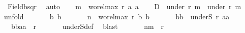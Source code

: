 \begin{isabellebody}
\ Field{\isacharunderscore}{\kern0pt}bsqr\ \isamarkupfalse%
\ auto\isanewline
\ \ \isamarkupfalse%
\ {\isacharquery}{\kern0pt}m\ {\isacharequal}{\kern0pt}\ {\isachardoublequoteopen}wo{\isacharunderscore}{\kern0pt}rel{\isachardot}{\kern0pt}max{}\ r\ a{}\ a{}{\isachardoublequoteclose}\isanewline
\ \ \isamarkupfalse%
\ {\isachardoublequoteopen}D\ {\isasymle}\ {\isacharparenleft}{\kern0pt}under\ r\ {\isacharquery}{\kern0pt}m{\isacharparenright}{\kern0pt}\ {\isasymtimes}\ {\isacharparenleft}{\kern0pt}under\ r\ {\isacharquery}{\kern0pt}m{\isacharparenright}{\kern0pt}{\isachardoublequoteclose}\isanewline
\ \ \isamarkupfalse%
{\isacharparenleft}{\kern0pt}unfold\ {}{\isacharparenright}{\kern0pt}\isanewline
\ \ \ \ \isacommand{{\isacharbraceleft}{\kern0pt}}\isamarkupfalse%
\isamarkupfalse%
\ b{}\ b{}\isanewline
\ \ \ \ \ \isamarkupfalse%
\ {\isacharquery}{\kern0pt}n\ {\isacharequal}{\kern0pt}\ {\isachardoublequoteopen}wo{\isacharunderscore}{\kern0pt}rel{\isachardot}{\kern0pt}max{}\ r\ b{}\ b{}{\isachardoublequoteclose}\isanewline
\ \ \ \ \ \isamarkupfalse%
\ {\isachardoublequoteopen}{\isacharparenleft}{\kern0pt}b{}{\isacharcomma}{\kern0pt}b{}{\isacharparenright}{\kern0pt}\ {\isasymin}\ underS\ {\isacharquery}{\kern0pt}r{\isacharprime}{\kern0pt}\ {\isacharparenleft}{\kern0pt}a{}{\isacharcomma}{\kern0pt}a{}{\isacharparenright}{\kern0pt}{\isachardoublequoteclose}\isanewline
\ \ \ \ \ \isamarkupfalse%
\ {}{\isacharcolon}{\kern0pt}\ {\isachardoublequoteopen}{\isacharparenleft}{\kern0pt}{\isacharparenleft}{\kern0pt}b{}{\isacharcomma}{\kern0pt}b{}{\isacharparenright}{\kern0pt}{\isacharcomma}{\kern0pt}{\isacharparenleft}{\kern0pt}a{}{\isacharcomma}{\kern0pt}a{}{\isacharparenright}{\kern0pt}{\isacharparenright}{\kern0pt}\ {\isasymin}\ {\isacharquery}{\kern0pt}r{\isacharprime}{\kern0pt}{\isachardoublequoteclose}\isanewline
\ \ \ \ \ \isamarkupfalse%
\ underS{\isacharunderscore}{\kern0pt}def\ \isamarkupfalse%
\ blast\isanewline
\ \ \ \ \ \isamarkupfalse%
\ {\isachardoublequoteopen}{\isacharparenleft}{\kern0pt}{\isacharquery}{\kern0pt}n{\isacharcomma}{\kern0pt}{\isacharquery}{\kern0pt}m{\isacharparenright}{\kern0pt}\ {\isasymin}\ r{\isachardoublequoteclose}\ \isamarkupfalse%

\end{isabellebody}
